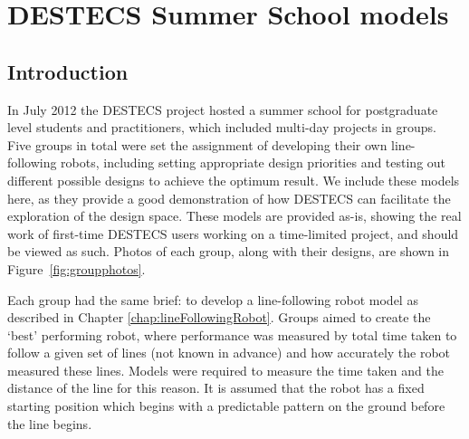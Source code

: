 \chapter{DESTECS Summer School models} \label{chap:summerschoolmodels}

\section{Introduction}\label{chap:summerschoolintro}
In July 2012 the DESTECS project hosted a summer school for
postgraduate level students and practitioners, which included
multi-day projects in groups.  Five groups in total were set the
assignment of developing their own line-following robots, including
setting appropriate design priorities and testing out different
possible designs to achieve the optimum result.  We include these
models here, as they provide a good demonstration of how DESTECS can
facilitate the exploration of the design space.  These models are
provided as-is, showing the real work of first-time DESTECS users
working on a time-limited project, and should be viewed as such. Photos of each group, along with their designs, are shown in Figure~\ref{fig:groupphotos}.

Each group had the same brief: to develop a line-following robot model
as described in Chapter \ref{chap:lineFollowingRobot}.  Groups aimed
to create the `best' performing robot, where performance was measured
by total time taken to follow a given set of lines (not known in
advance) and how accurately the robot measured these lines.  Models
were required to measure the time taken and the distance of the line
for this reason.  It is assumed that the robot has a fixed starting
position which begins with a predictable pattern on the ground before
the line begins.

